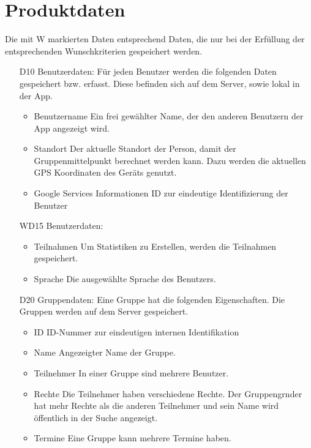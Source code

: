 \documentclass{scrartcl}
\begin{document}
	
	\newpage
	
	
	\section{Produktdaten}
	
	Die mit W markierten Daten entsprechend Daten, die nur bei der Erfüllung der entsprechenden Wunschkriterien gespeichert werden.
	\begin{itemize}
		\item [D10] Benutzerdaten:
		\newline Für jeden Benutzer werden die folgenden Daten gespeichert bzw. erfasst. Diese befinden sich auf dem Server, sowie lokal in der App.
		\begin{itemize}
			\item Benutzername
			\newline Ein frei gewählter Name, der den anderen Benutzern der App angezeigt wird.
			\item Standort
			\newline Der aktuelle Standort der Person, damit der Gruppenmittelpunkt berechnet werden kann. Dazu werden die aktuellen GPS Koordinaten des Geräts genutzt.
			\item \gls{Google Services} Informationen
			\newline ID zur eindeutige Identifizierung der Benutzer
		\end{itemize}
		
		\item [WD15] Benutzerdaten:
		\begin{itemize}
			\item Teilnahmen
			\newline Um Statistiken zu Erstellen, werden die Teilnahmen gespeichert.
			\item Sprache
			\newline Die ausgewählte Sprache des Benutzers.
			
		\end{itemize}
		
		
		\item [D20] Gruppendaten:
		\newline Eine Gruppe hat die folgenden Eigenschaften.
		Die Gruppen werden auf dem Server gespeichert.
		\begin{itemize}
			\item ID
			\newline ID-Nummer zur eindeutigen internen Identifikation
			\item Name
			\newline Angezeigter Name der Gruppe.
			\item \gls{Teilnehmer}
			\newline In einer Gruppe sind mehrere Benutzer.
			\item Rechte
			\newline Die \gls{Teilnehmer} haben verschiedene Rechte. Der \gls{Gruppengrnder} hat mehr Rechte als die anderen Teilnehmer und sein Name wird öffentlich in der Suche angezeigt.
			\item Termine
			\newline Eine Gruppe kann mehrere Termine haben.
		\end{itemize}
		

\end{itemize}
\end{document}
